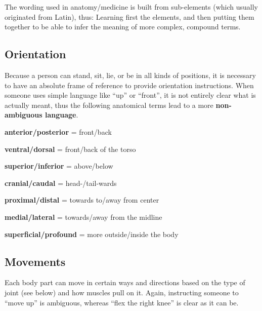 The wording used in anatomy/medicine is built from sub-elements (which usually originated from Latin), thus:
Learning first the elements, and then putting them together to be able to infer the meaning of more complex, compound terms.

\subsection{Orientation}

Because a person can stand, sit, lie, or be in all kinds of positions, it is necessary to have an absolute frame of reference to provide orientation instructions.
When someone uses simple language like ``up'' or ``front'', it is not entirely clear what is actually meant, thus the following anatomical terms lead to a more \textbf{non-ambiguous language}.

\begin{itemize*}
    \item \textbf{anterior/posterior} = front/back
    \item \textbf{ventral/dorsal} = front/back of the torso
    \item \textbf{superior/inferior} = above/below
    \item \textbf{cranial/caudal} = head-/tail-wards
    \item \textbf{proximal/distal} = towards to/away from center
    \item \textbf{medial/lateral} = towards/away from the midline
    \item \textbf{superficial/profound} = more outside/inside the body
\end{itemize*}

\subsection{Movements}

Each body part can move in certain ways and directions based on the type of joint (see below) and how muscles pull on it.
Again, instructing someone to ``move up'' is ambiguous, whereas ``flex the right knee'' is clear as it can be.

